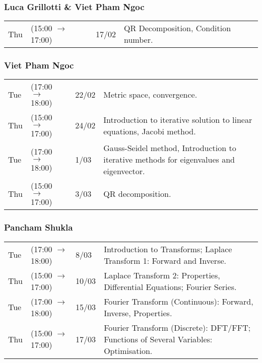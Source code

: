 \documentclass{report}
\begin{document}
\subsubsection*{Luca Grillotti \& Viet Pham Ngoc}
\begin{center}
	\begin{tabular}{l l l p{}}
		Thu & (15:00 $\to$ 17:00) & 17/02 & QR Decomposition, Condition number. \\
	\end{tabular}
\end{center}
\subsubsection*{Viet Pham Ngoc}
\begin{center}
	\begin{tabular}{l l l p{}}
		Tue & (17:00 $\to$ 18:00) & 22/02 & Metric space, convergence.                                                              \\
		Thu & (15:00 $\to$ 17:00) & 24/02 & Introduction to iterative solution to linear equations, Jacobi method.                  \\
		Tue & (17:00 $\to$ 18:00) & 1/03  & Gauss-Seidel method, Introduction to iterative methods for eigenvalues and eigenvector. \\
		Thu & (15:00 $\to$ 17:00) & 3/03  & QR decomposition.                                                                       \\
	\end{tabular}
\end{center}
\subsubsection*{Pancham Shukla}
\begin{center}
	\begin{tabular}{l l l p{}}
		Tue & (17:00 $\to$ 18:00) & 8/03  & Introduction to Transforms; Laplace Transform 1: Forward and Inverse.                \\
		Thu & (15:00 $\to$ 17:00) & 10/03 & Laplace Transform 2: Properties, Differential Equations; Fourier Series.             \\
		Tue & (17:00 $\to$ 18:00) & 15/03 & Fourier Transform (Continuous): Forward, Inverse, Properties.                        \\
		Thu & (15:00 $\to$ 17:00) & 17/03 & Fourier Transform (Discrete): DFT/FFT; Functions of Several Variables: Optimisation. \\
	\end{tabular}
\end{center}
\end{document}
